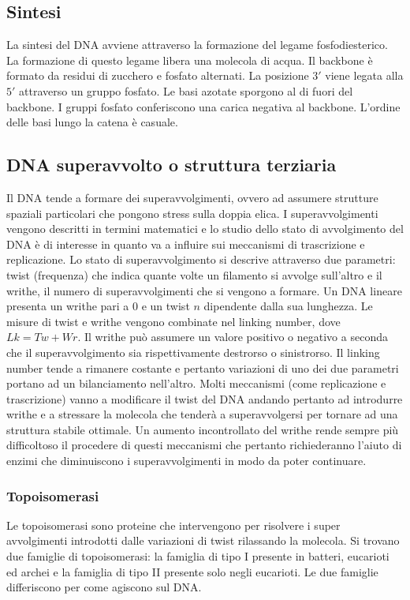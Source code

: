 	\subsection{Sintesi}
	La sintesi del DNA avviene attraverso la formazione del legame fosfodiesterico.
	La formazione di questo legame libera una molecola di acqua.
	Il backbone \`e formato da residui di zucchero e fosfato alternati.
	La posizione $3'$ viene legata alla $5'$ attraverso un gruppo fosfato.
	Le basi azotate sporgono al di fuori del backbone.
	I gruppi fosfato conferiscono una carica negativa al backbone.
	L'ordine delle basi lungo la catena \`e casuale.

	\subsection{DNA superavvolto o struttura terziaria}
	Il DNA tende a formare dei superavvolgimenti, ovvero ad assumere strutture spaziali particolari che pongono stress sulla doppia elica. 
	I superavvolgimenti vengono descritti in termini matematici e lo studio dello stato di avvolgimento del DNA \`e di interesse in quanto va a influire sui meccanismi di trascrizione e replicazione. 
	Lo stato di superavvolgimento si descrive attraverso due parametri: twist (frequenza) che indica quante volte un filamento si avvolge sull'altro e il writhe, il numero di superavvolgimenti che si vengono a formare. 
	Un DNA lineare presenta un writhe pari a $0$ e un twist $n$ dipendente dalla sua lunghezza. 
	Le misure di twist e writhe vengono combinate nel linking number, dove $Lk=Tw+Wr$. 
	Il writhe pu\`o assumere un valore positivo o negativo a seconda che il superavvolgimento sia rispettivamente destrorso o sinistrorso. 
	Il linking number tende a rimanere costante e pertanto variazioni di uno dei due parametri portano ad un bilanciamento nell'altro. 
	Molti meccanismi (come replicazione e trascrizione) vanno a modificare il twist del DNA andando pertanto ad introdurre writhe e a stressare la molecola che tender\`a a superavvolgersi per tornare ad una struttura stabile ottimale. 
	Un aumento incontrollato del writhe rende sempre pi\`u difficoltoso il procedere di questi meccanismi che pertanto richiederanno l'aiuto di enzimi che diminuiscono i superavvolgimenti in modo da poter continuare.

		\subsubsection{Topoisomerasi}
		Le topoisomerasi sono proteine che intervengono per risolvere i super avvolgimenti introdotti dalle variazioni di twist rilassando la molecola. 
		Si trovano due famiglie di topoisomerasi: la famiglia di tipo I presente in batteri, eucarioti ed archei e la famiglia di tipo II presente solo negli eucarioti. 
		Le due famiglie differiscono per come agiscono sul DNA.

